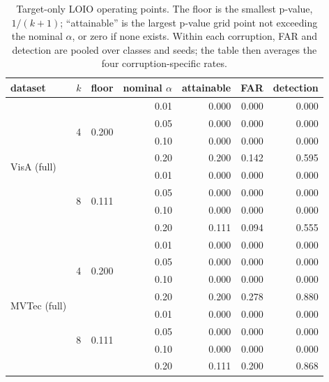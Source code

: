 \begin{table}[pos=t]
\centering
\caption{Target-only LOIO operating points. The floor is the smallest p-value, $1/(k{+}1)$; ``attainable'' is the largest p-value grid point not exceeding the nominal $\alpha$, or zero if none exists. Within each corruption, FAR and detection are pooled over classes and seeds; the table then averages the four corruption-specific rates.}
\label{tab:attainable-alpha}
\footnotesize
\setlength{\tabcolsep}{3pt}
\begin{tabular}{llrrrrr}
\toprule
dataset & $k$ & floor & nominal $\alpha$ & attainable & FAR & detection \\
\midrule
\multirow{8}{*}{VisA (full)} & \multirow{4}{*}{4} & \multirow{4}{*}{0.200} & 0.01 & 0.000 & 0.000 & 0.000 \\
 & & & 0.05 & 0.000 & 0.000 & 0.000 \\
 & & & 0.10 & 0.000 & 0.000 & 0.000 \\
 & & & 0.20 & 0.200 & 0.142 & 0.595 \\
\cmidrule(lr){2-7}
 & \multirow{4}{*}{8} & \multirow{4}{*}{0.111} & 0.01 & 0.000 & 0.000 & 0.000 \\
 & & & 0.05 & 0.000 & 0.000 & 0.000 \\
 & & & 0.10 & 0.000 & 0.000 & 0.000 \\
 & & & 0.20 & 0.111 & 0.094 & 0.555 \\
\midrule
\multirow{8}{*}{MVTec (full)} & \multirow{4}{*}{4} & \multirow{4}{*}{0.200} & 0.01 & 0.000 & 0.000 & 0.000 \\
 & & & 0.05 & 0.000 & 0.000 & 0.000 \\
 & & & 0.10 & 0.000 & 0.000 & 0.000 \\
 & & & 0.20 & 0.200 & 0.278 & 0.880 \\
\cmidrule(lr){2-7}
 & \multirow{4}{*}{8} & \multirow{4}{*}{0.111} & 0.01 & 0.000 & 0.000 & 0.000 \\
 & & & 0.05 & 0.000 & 0.000 & 0.000 \\
 & & & 0.10 & 0.000 & 0.000 & 0.000 \\
 & & & 0.20 & 0.111 & 0.200 & 0.868 \\
\bottomrule
\end{tabular}
\end{table}
